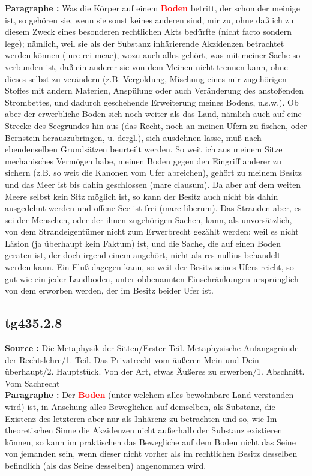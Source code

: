 \documentclass[a4paper,12pt,twoside]{book}
\newcommand{\match}[1]{\textcolor{red}{\textbf{#1}}}
\begin{document}
	\textbf{Paragraphe : }Was die Körper auf einem \match{Boden} betritt, der schon der meinige ist, so gehören sie, wenn sie sonst keines anderen sind, mir zu, ohne daß ich zu diesem Zweck eines besonderen rechtlichen Akts bedürfte (nicht facto sondern lege); nämlich, weil sie als der Substanz inhärierende Akzidenzen betrachtet werden können (iure rei  meae), wozu auch alles gehört, was mit meiner Sache so verbunden ist, daß ein anderer sie von dem Meinen nicht trennen kann, ohne dieses selbst zu verändern (z.B. Vergoldung, Mischung eines mir zugehörigen Stoffes mit andern Materien, Anspülung oder auch Veränderung des anstoßenden Strombettes, und dadurch geschehende Erweiterung meines Bodens, u.s.w.). Ob aber der erwerbliche Boden sich noch weiter als das Land, nämlich auch auf eine Strecke des Seegrundes hin aus (das Recht, noch an meinen Ufern zu fischen, oder Bernstein herauszubringen, u. dergl.), sich ausdehnen lasse, muß nach ebendenselben Grundsätzen beurteilt werden. So weit ich aus meinem Sitze mechanisches Vermögen habe, meinen Boden gegen den Eingriff anderer zu sichern (z.B. so weit die Kanonen vom Ufer abreichen), gehört zu meinem Besitz und das Meer ist bis dahin geschlossen (mare clausum). Da aber auf dem weiten Meere selbst kein Sitz möglich ist, so kann der Besitz auch nicht bis dahin ausgedehnt werden und offene See ist frei (mare liberum). Das Stranden aber, es sei der Menschen, oder der ihnen zugehörigen Sachen, kann, als unvorsätzlich, von dem Strandeigentümer nicht zum Erwerbrecht gezählt werden; weil es nicht Läsion (ja überhaupt kein Faktum) ist, und die Sache, die auf einen Boden geraten ist, der doch irgend einem angehört, nicht als res nullius behandelt werden kann. Ein Fluß dagegen kann, so weit der Besitz seines Ufers reicht, so gut wie ein jeder Landboden, unter obbenannten Einschränkungen ursprünglich von dem erworben werden, der im Besitz beider Ufer ist. 
	
	\subsection*{tg435.2.8} 
	\textbf{Source : }Die Metaphysik der Sitten/Erster Teil. Metaphysische Anfangsgründe der Rechtslehre/1. Teil. Das Privatrecht vom äußeren Mein und Dein überhaupt/2. Hauptstück. Von der Art, etwas Äußeres zu erwerben/1. Abschnitt. Vom Sachrecht\\  
	
	\textbf{Paragraphe : }Der \match{Boden} (unter welchem alles bewohnbare Land verstanden wird) ist, in Ansehung alles Beweglichen auf demselben, als Substanz, die Existenz des letzteren aber nur als Inhärenz zu betrachten und so, wie Im theoretischen Sinne die Akzidenzen nicht außerhalb der Substanz existieren können, so kann im praktischen das Bewegliche auf dem Boden nicht das Seine von jemanden sein, wenn dieser nicht vorher als im rechtlichen Besitz desselben befindlich (als das Seine desselben) angenommen wird. 
	
\end{document}
